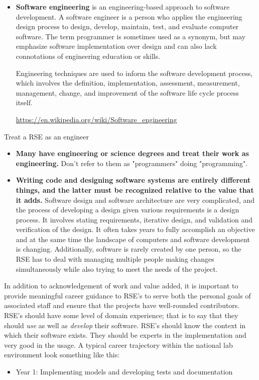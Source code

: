 \documentclass[]{nrel}
\begin{document}
\begin{appendices}
\begin{itemize}
\item \textbf{Software engineering} is an engineering-based approach to software development. A software
engineer is a person who applies the engineering design process to design, develop, maintain,
test, and evaluate computer software. The term programmer is sometimes used as a synonym,
but may emphasize software implementation over design and can also lack connotations of
engineering education or skills.

Engineering techniques are used to inform the software development process, which involves the
definition, implementation, assessment, measurement, management, change, and improvement of
the software life cycle process itself.

\url{https://en.wikipedia.org/wiki/Software\_engineering}

\end{itemize}

Treat a RSE as an engineer
\begin{itemize}
\item \textbf{Many have engineering or science degrees and treat their work as engineering.}
Don’t refer to them as "programmers" doing "programming".

\item \textbf{Writing code and designing software systems are entirely different things, and the latter must be recognized relative to the value that it adds.}
Software design and software architecture are very complicated, and the process of developing
a design given various requirements is a design process. It involves stating requirements,
iterative design, and validation and verification of the design. It often takes years to fully
accomplish an objective and at the same time the landscape of computers and software
development is changing. Additionally, software is rarely created by one person, so the RSE
has to deal with managing multiple people making changes simultaneously while also trying to
meet the needs of the project.

\end{itemize}

In addition to acknowledgement of work and value added, it is important to provide meaningful
career guidance to RSE’s to serve both the personal goals of associated staff and ensure
that the projects have well-rounded contributors. RSE’s should have some level of domain
experience; that is to say that they should \textit{use} as well as \textit{develop} their software.
RSE’s should know the context in which their software exists.
They should be experts in the implementation and very good in the usage.
A typical career trajectory within the national lab environment look something like this:
\begin{itemize}
\item Year 1: Implementing models and developing tests and documentation


\end{itemize}
\end{appendices}
\end{document}
